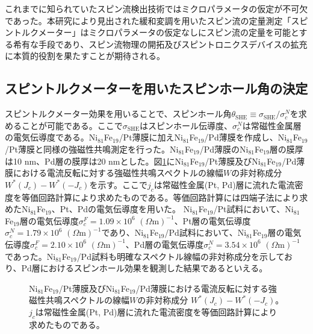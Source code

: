 これまでに知られていたスピン流検出技術ではミクロパラメータの仮定が不可欠であった。本研究により見出された緩和変調を用いたスピン流の定量測定「スピントルクメーター」はミクロパラメータの仮定なしにスピン流の定量を可能とする希有な手段であり、スピン流物理の開拓及びスピントロニクスデバイスの拡充に本質的役割を果たすことが期待される。





\subsection{スピントルクメーターを用いたスピンホール角の決定}
スピントルクメーター効果を用いることで、スピンホール角$\theta_\text{SHE}\equiv \sigma_\text{SHE}/\sigma^N_c$を求めることが可能である。ここで$\sigma_\text{SHE}$はスピンホール伝導度、$\sigma_c^N$は常磁性金属層の電気伝導度である。Ni$_{81}$Fe$_{19}$/Pt薄膜に加えNi$_{81}$Fe$_{19}$/Pd薄膜を作成し、Ni$_{81}$Fe$_{19}$/Pt薄膜と同様の強磁性共鳴測定を行った。Ni$_{81}$Fe$_{19}$/Pd薄膜のNi$_{81}$Fe$_{19}$層の膜厚は10 nm、Pd層の膜厚は20 nmとした。図\ref{hallangle}にNi$_{81}$Fe$_{19}$/Pt薄膜及びNi$_{81}$Fe$_{19}$/Pd薄膜における電流反転に対する強磁性共鳴スペクトルの線幅$W$の非対称成分
$W^*(J_c)-W^*(-J_c)$を示す。ここで$j_c$は常磁性金属(Pt, Pd)層に流れた電流密度を等価回路計算により求めたものである。等価回路計算には四端子法により求めたNi$_{81}$Fe$_{19}$、Pt、Pdの電気伝導度を用いた。
Ni$_{81}$Fe$_{19}$/Pt試料において、Ni$_{81}$Fe$_{19}$層の電気伝導度$\sigma_c^F=1.09\times10^6$ $(\Omega \text{m})^{-1}$、Pt層の電気伝導度$\sigma_c^N=1.79\times10^6$ $(\Omega \text{m})^{-1}$であり、Ni$_{81}$Fe$_{19}$/Pd試料において、Ni$_{81}$Fe$_{19}$層の電気伝導度$\sigma_c^F=2.10\times10^6$ $(\Omega \text{m})^{-1}$、Pd層の電気伝導度$\sigma_c^N=3.54\times10^6$ $(\Omega \text{m})^{-1}$であった。Ni$_{81}$Fe$_{19}$/Pd試料も明確なスペクトル線幅の非対称成分を示しており、Pd層におけるスピンホール効果を観測した結果であるといえる。




\begin{figure}[tbp]
 \begin{center}
 \caption{Ni$_{81}$Fe$_{19}$/Pt薄膜及びNi$_{81}$Fe$_{19}$/Pd薄膜における電流反転に対する強磁性共鳴スペクトルの線幅$W$の非対称成分
$W^*(J_c)-W^*(-J_c)$。$j_c$は常磁性金属(Pt, Pd)層に流れた電流密度を等価回路計算により求めたものである。}
 \label{hallangle}
 \end{center}
\end{figure}



